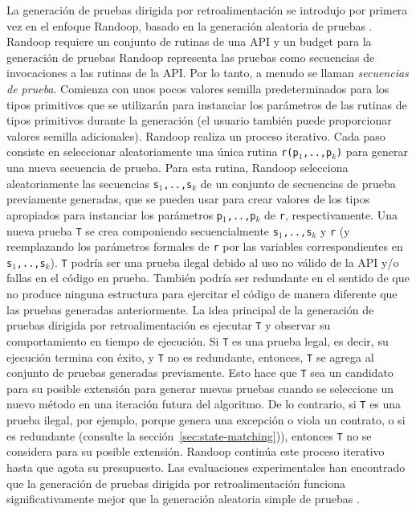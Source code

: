 La generación de pruebas dirigida por retroalimentación se introdujo por primera vez en el enfoque \textsf{Randoop}, basado en la generación aleatoria de pruebas \cite{Pacheco07}. \textsf{Randoop} requiere un conjunto de rutinas de una API y un budget para la generación de pruebas 
\textsf{Randoop} representa las pruebas como secuencias de invocaciones a las rutinas de la API. Por lo tanto, a menudo se llaman \emph{secuencias de prueba}. Comienza con unos pocos valores semilla predeterminados para los tipos primitivos que se utilizarán para instanciar los parámetros de las rutinas de tipos primitivos durante la generación (el usuario también puede proporcionar valores semilla adicionales). \textsf{Randoop} realiza un proceso iterativo. Cada paso consiste en seleccionar aleatoriamente una única rutina \texttt{r(p$_1$,..,p$_k$)} para generar una nueva secuencia de prueba. Para esta rutina, \textsf{Randoop} selecciona aleatoriamente las secuencias \texttt{s$_1$,..,s$_k$} de un conjunto de secuencias de prueba previamente generadas, que se pueden usar para crear valores de los tipos apropiados para instanciar los parámetros \texttt{p$_1$,..,p$_k$} de \texttt{r}, respectivamente. Una nueva prueba \texttt{T} se crea componiendo secuencialmente \texttt{s$_1$,..,s$_k$} y \texttt{r} (y reemplazando los parámetros formales de \texttt{r} por las variables correspondientes en \texttt{s$_1$,..,s$_k$}). \texttt{T} podría ser una prueba ilegal debido al uso no válido de la API y/o fallas en el código en prueba. También podría ser redundante en el sentido de que no produce ninguna estructura para ejercitar el código de manera diferente que las pruebas generadas anteriormente.
La idea principal de la generación de pruebas dirigida por retroalimentación es ejecutar \texttt{T} y observar su comportamiento en tiempo de ejecución. Si \texttt{T} es una prueba legal, es decir, su ejecución termina con éxito,
y \texttt{T} no es redundante, entonces, \texttt{T} se agrega al conjunto de pruebas generadas previamente. Esto hace que \texttt{T} sea un candidato para su posible extensión para generar nuevas pruebas cuando se seleccione un nuevo método en una iteración futura del algoritmo. De lo contrario, si \texttt{T} es una prueba ilegal, por ejemplo, porque genera una excepción o viola un contrato, o si es redundante (consulte la sección~\ref{sec:state-matching})), entonces \texttt{T} no se considera para su posible extensión. \textsf{Randoop} continúa este proceso iterativo hasta que agota su presupuesto. Las evaluaciones experimentales han encontrado que la generación de pruebas dirigida por retroalimentación funciona significativamente mejor que la generación aleatoria simple de pruebas \cite{Pacheco07,Pacheco08}.
